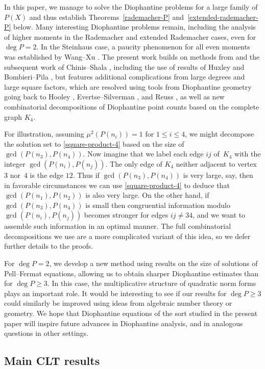 \documentclass[reqno, 12pt]{amsart}
\theoremstyle{plain}
\theoremstyle{definition}
\theoremstyle{remark}
\renewcommand{\le}{\leqslant}
\renewcommand{\ge}{\geqslant}
\begin{document}
In this paper, we manage to solve the Diophantine problems for a large family of $P(X)$ and thus 
establish Theorems~\ref{rademacher-P} and~\ref{extended-rademacher-P} below.
Many interesting Diophantine problems remain,
including the analysis of higher moments in the Rademacher and extended Rademacher cases,
even for $\deg{P}=2$.
In the Steinhaus case, a paucity phenomenon for all even moments was established by Wang--Xu \cite{WX}.
The present work builds on methods from
\cite{WX} and the subsequent work of Chinis--Shala \cite{CS25},
including the use of results of Huxley \cite{Huxley} and Bombieri--Pila \cite{BP},
but features additional complications
from large degrees and large square factors,
which are resolved using tools from Diophantine geometry
going back to Hooley \cite{H84},
Evertse--Silverman \cite{ES86},
and Reuss \cite{Reuss},
as well as new combinatorial decompositions of Diophantine point counts
based on the complete graph $K_4$.

For illustration, assuming $\mu^2(P(n_i))=1$ for $1\le i\le 4$,
we might decompose the solution set to \eqref{square-product-4}
based on the size of $\gcd(P(n_3),P(n_4))$.
Now imagine that we label each edge $ij$ of~$K_4$
with the integer $\gcd(P(n_i),P(n_j))$.
The only edge of $K_4$
neither adjacent to vertex $3$ nor~$4$
is the edge $12$.
Thus if $\gcd(P(n_3),P(n_4))$ is very large, say, then in favorable circumstances
we can use \eqref{square-product-4} to deduce that $\gcd(P(n_1),P(n_2))$ is also very large.
On the other hand, if $\gcd(P(n_3),P(n_4))$ is small then congruential information modulo
$\gcd(P(n_i),P(n_j))$ becomes stronger for edges $ij\ne 34$,
and we want to assemble such information in an optimal manner.
The full combinatorial decompositions we use
are a more complicated variant of this idea, so we defer further details to the proofs.

For $\deg P=2$, we develop a new method using results on the size of solutions of Pell--Fermat equations, allowing us to obtain sharper Diophantine estimates than for $\deg P\ge 3$.
In this case, the multiplicative structure of quadratic norm forms
plays an important role.
It would be interesting to see if our results for $\deg{P}\ge 3$
could similarly be improved using ideas from algebraic number theory or geometry.
We hope that Diophantine equations of the sort studied in the present paper
will inspire future advances in Diophantine analysis,
and in analogous questions in other settings.

\subsection*{Main CLT results}
\end{document}
